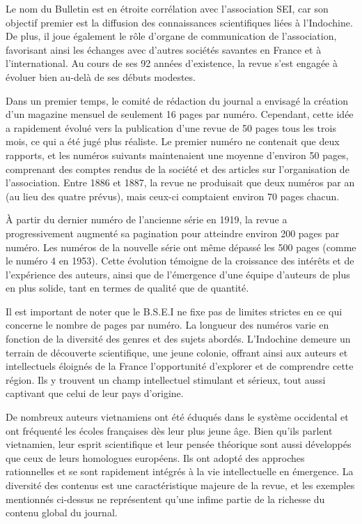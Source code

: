 Le nom du Bulletin est en étroite corrélation avec l'association SEI, car son objectif premier est la diffusion des connaissances scientifiques liées à l'Indochine. De plus, il joue également le rôle d'organe de communication de l'association, favorisant ainsi les échanges avec d'autres sociétés savantes en France et à l'international. Au cours de ses 92 années d'existence, la revue s'est engagée à évoluer bien au-delà de ses débuts modestes.

Dans un premier temps, le comité de rédaction du journal a envisagé la création d'un magazine mensuel de seulement 16 pages par numéro. Cependant, cette idée a rapidement évolué vers la publication d'une revue de 50 pages tous les trois mois, ce qui a été jugé plus réaliste. Le premier numéro ne contenait que deux rapports, et les numéros suivants maintenaient une moyenne d'environ 50 pages, comprenant des comptes rendus de la société et des articles sur l'organisation de l'association. Entre 1886 et 1887, la revue ne produisait que deux numéros par an (au lieu des quatre prévus), mais ceux-ci comptaient environ 70 pages chacun.

À partir du dernier numéro de l'ancienne série en 1919, la revue a progressivement augmenté sa pagination pour atteindre environ 200 pages par numéro. Les numéros de la nouvelle série ont même dépassé les 500 pages (comme le numéro 4 en 1953). Cette évolution témoigne de la croissance des intérêts et de l'expérience des auteurs, ainsi que de l'émergence d'une équipe d'auteurs de plus en plus solide, tant en termes de qualité que de quantité.

Il est important de noter que le B.S.E.I ne fixe pas de limites strictes en ce qui concerne le nombre de pages par numéro. La longueur des numéros varie en fonction de la diversité des genres et des sujets abordés. L'Indochine demeure un terrain de découverte scientifique, une jeune colonie, offrant ainsi aux auteurs et intellectuels éloignés de la France l'opportunité d'explorer et de comprendre cette région. Ils y trouvent un champ intellectuel stimulant et sérieux, tout aussi captivant que celui de leur pays d'origine.

De nombreux auteurs vietnamiens ont été éduqués dans le système occidental et ont fréquenté les écoles françaises dès leur plus jeune âge. Bien qu'ils parlent vietnamien, leur esprit scientifique et leur pensée théorique sont aussi développés que ceux de leurs homologues européens. Ils ont adopté des approches rationnelles et se sont rapidement intégrés à la vie intellectuelle en émergence. La diversité des contenus est une caractéristique majeure de la revue, et les exemples mentionnés ci-dessus ne représentent qu'une infime partie de la richesse du contenu global du journal.


